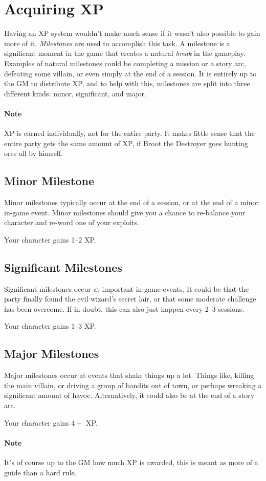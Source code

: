 \section{Acquiring XP}
Having an XP system wouldn't make much sense if it wasn't also possible to gain more of it.
\textit{Milestones} are used to accomplish this task.
A milestone is a significant moment in the game that creates a natural \textit{break} in the gameplay.
Examples of natural milestones could be completing a mission or a story arc, defeating some villain, or even simply at the end of a session.
It is entirely up to the GM to distribute XP, and to help with this, milestones are split into three different kinds: minor, significant, and major.

\paragraph{Note} XP is earned individually, not for the entire party.
It makes little sense that the entire party gets the same amount of XP, if Broot the Destroyer goes hunting orcs all by himself.

\subsection{Minor Milestone}
Minor milestones typically occur at the end of a session, or at the end of a minor in-game event.
Minor milestones should give you a chance to re-balance your character and re-word one of your exploits.

Your character gains 1--2 XP.

\subsection{Significant Milestones}
Significant milestones occur at important in-game events.
It could be that the party finally found the evil wizard's secret lair, or that some moderate challenge has been overcome.
If in doubt, this can also just happen every 2--3 sessions.

Your character gains 1--3 XP.

\subsection{Major Milestones}
Major milestones occur at events that shake things up a lot.
Things like, killing the main villain, or driving a group of bandits out of town, or perhaps wreaking a significant amount of havoc.
Alternatively, it could also be at the end of a story arc.

Your character gains $4+$ XP.

\paragraph{Note} It's of course up to the GM how much XP is awarded, this is meant as more of a guide than a hard rule.
